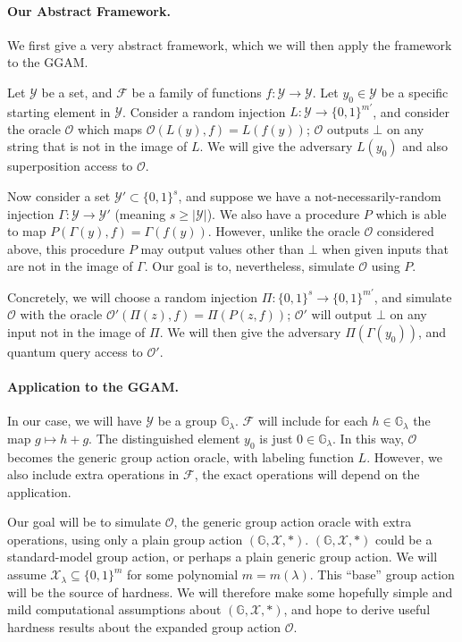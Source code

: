 \documentclass{article}\usepackage[a4paper,margin=20mm]{geometry}
\numberwithin{theorem}{section}
\numberwithin{equation}{section}
\newcommand{\G}{\mathbb{G}}
\newcommand{\Fs}{{\mathcal{F}}}
\newcommand{\Os}{{\mathcal{O}}}
\newcommand{\Xs}{{\mathcal{X}}}
\newcommand{\Ys}{{\mathcal{Y}}}
\begin{document}
\paragraph{Our Abstract Framework.} We first give a very abstract framework, which we will then apply the framework to the GGAM.

Let $\Ys$ be a set, and $\Fs$ be a family of functions $f:\Ys\rightarrow\Ys$. Let $y_0\in\Ys$ be a specific starting element in $\Ys$. Consider a random injection $L:\Ys\rightarrow\{0,1\}^{m'}$, and consider the oracle $\Os$ which maps $\Os(L(y),f)=L(f(y))$; $\Os$ outputs $\bot$ on any string that is not in the image of $L$. We will give the adversary $L(y_0)$ and also superposition access to $\Os$.

Now consider a set $\Ys'\subset\{0,1\}^s$, and suppose we have a not-necessarily-random injection $\Gamma:\Ys\rightarrow\Ys'$ (meaning $s\geq |\Ys|$). We also have a procedure $P$ which is able to map $P(\Gamma(y),f)=\Gamma(f(y))$. However, unlike the oracle $\Os$ considered above, this procedure $P$ may output values other than $\bot$ when given inputs that are not in the image of $\Gamma$. Our goal is to, nevertheless, simulate $\Os$ using $P$.

Concretely, we will choose a random injection $\Pi:\{0,1\}^s\rightarrow\{0,1\}^{m'}$, and simulate $\Os$ with the oracle $\Os'(\Pi(z),f)=\Pi(P(z,f))$; $\Os'$ will output $\bot$ on any input not in the image of $\Pi$. We will then give the adversary $\Pi(\Gamma(y_0))$, and quantum query access to $\Os'$.


\paragraph{Application to the GGAM.} In our case, we will have $\Ys$ be a group $\G_\lambda$. $\Fs$ will include for each $h\in\G_\lambda$ the map $g\mapsto h+g$. The distinguished element $y_0$ is just $0\in\G_\lambda$. In this way, $\Os$ becomes the generic group action oracle, with labeling function $L$. However, we also include extra operations in $\Fs$, the exact operations will depend on the application.

Our goal will be to simulate $\Os$, the generic group action oracle with extra operations, using only a plain group action $(\G,\Xs,*)$. $(\G,\Xs,*)$ could be a standard-model group action, or perhaps a plain generic group action. We will assume $\Xs_\lambda\subseteq\{0,1\}^{m}$ for some polynomial $m=m(\lambda)$. This ``base'' group action will be the source of hardness. We will therefore make some hopefully simple and mild computational assumptions about $(\G,\Xs,*)$, and hope to derive useful hardness results about the expanded group action $\Os$.
\end{document}
